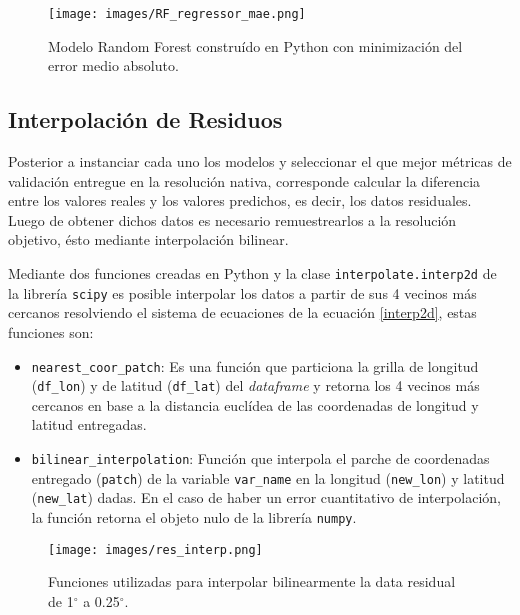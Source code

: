 \begin{figure}[H]
    \centering
          \texttt{[image: images/RF\_regressor\_mae.png]}
          \vskip -0.1in
    \caption[Construcción y entrenamiento del modelo Random Forest con criterio de \textit{mae}]{\footnotesize Modelo Random Forest construído en Python con minimización del error medio absoluto.}
    \label{logo3}
\end{figure}

    \subsection{Interpolación de Residuos}

    Posterior a instanciar cada uno los modelos y seleccionar el que mejor métricas de validación entregue en la resolución nativa, corresponde calcular la diferencia entre los valores reales y los valores predichos, es decir, los datos residuales.
    Luego de obtener dichos datos es necesario remuestrearlos a la resolución objetivo, ésto mediante interpolación bilinear.
 
    Mediante dos funciones creadas en Python y la clase \texttt{interpolate.interp2d} de la librería \texttt{scipy} es posible interpolar los datos a partir de sus 4 vecinos más cercanos resolviendo el sistema de ecuaciones
    de la ecuación \ref{interp2d}, estas funciones son:
    \begin{itemize}
        \item {\texttt{nearest\_coor\_patch}: Es una función que particiona la grilla de longitud (\texttt{df\_lon}) y de latitud (\texttt{df\_lat}) del \textit{dataframe} y retorna los 4 vecinos más cercanos en base a la distancia euclídea
        de las coordenadas de longitud y latitud entregadas.}
        \item {\texttt{bilinear\_interpolation}: Función que interpola el parche de coordenadas entregado (\texttt{patch}) de la variable \texttt{var\_name} en la longitud (\texttt{new\_lon}) y latitud (\texttt{new\_lat}) dadas. En el caso de haber un error cuantitativo de interpolación,
         la función retorna el objeto nulo de la librería \texttt{numpy}.}
    \end{itemize}
    \begin{figure}[H]
        \centering
              \texttt{[image: images/res\_interp.png]}
              \vskip -0.1in
        \caption[Funciones utilizadas para la interpolación de residuos]{\footnotesize Funciones utilizadas para interpolar bilinearmente la data residual de 1$^{\circ}$ a 0.25$^{\circ}$.}
        \label{logo4}
    \end{figure}

